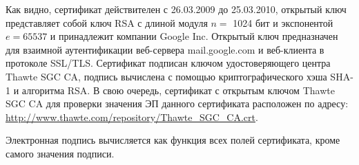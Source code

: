 Как видно, сертификат действителен с 26.03.2009 до 25.03.2010, открытый ключ представляет собой ключ RSA с длиной модуля $n=$ 1024 бит и экспонентой $e = 65537$ и принадлежит компании Google Inc. Открытый ключ предназначен для взаимной аутентификации веб-сервера mail.google.com и веб-клиента в протоколе SSL/TLS. Сертификат подписан ключом удостоверяющего центра Thawte SGC CA, подпись вычислена с помощью криптографического хэша SHA-1 и алгоритма RSA. В свою очередь, сертификат с открытым ключом Thawte SGC CA для проверки значения ЭП данного сертификата расположен по адресу: \url{http://www.thawte.com/repository/Thawte\_SGC\_CA.crt}.

Электронная подпись вычисляется как функция всех полей сертификата, кроме самого значения подписи.
